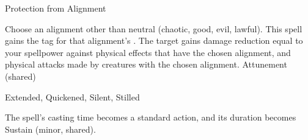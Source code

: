 \begin{spellsection}{Protection from Alignment}
\begin{spellcontent}
\begin{spelltargetinginfo}
\end{spelltargetinginfo}
\begin{spelleffects}
\spellspecial
Choose an alignment other than neutral (chaotic, good, evil, lawful).
This spell gains the tag for that alignment's .
\spelleffect
The target gains damage reduction equal to your spellpower against physical effects that have the chosen alignment, and physical attacks made by creatures with the chosen alignment.
\spelldur Attunement (shared)
\end{spelleffects}
\end{spellcontent}
\begin{spellfooter}
 Extended, Quickened, Silent, Stilled
\end{spellfooter}
\begin{spellsubcontent}
\begin{spellcantrip}
The spell's casting time becomes a standard action, and its duration becomes Sustain (minor, shared).
\end{spellcantrip}
\end{spellsubcontent}
\end{spellsection}
